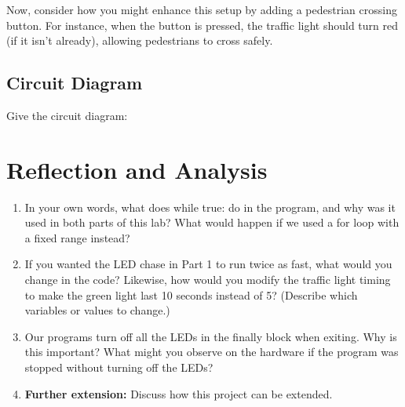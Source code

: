 \documentclass[a4paper,11pt]{article}
\begin{document}
Now, consider how you might enhance this setup by adding a pedestrian crossing button. For instance, when the button is pressed, the traffic light should turn red (if it isn’t already), allowing pedestrians to cross safely.


\subsection*{Circuit Diagram}
Give the circuit diagram:

\newpage
\section*{Reflection and Analysis}
\begin{enumerate}
    \item In your own words, what does while true: do in the program, 
    and why was it used in both parts of this lab? What would happen 
    if we used a for loop with a fixed range instead?

    \item If you wanted the LED chase in Part 1 to run twice as fast, 
    what would you change in the code? Likewise, how would you modify 
    the traffic light timing to make the green light last 10 seconds 
    instead of 5? (Describe which variables or values to change.)

    \item Our programs turn off all the LEDs in the finally block when exiting. 
    Why is this important? What might you observe on the hardware if the program 
    was stopped without turning off the LEDs?

    \item \textbf{Further extension:} Discuss how this project can be extended. 

\end{enumerate}
\end{document}
